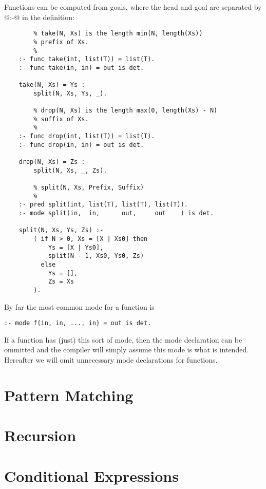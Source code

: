 Functions can be computed from goals, where the head and goal
are separated by @:-@ in the definition:
\begin{verbatim}
        % take(N, Xs) is the length min(N, length(Xs))
        % prefix of Xs.
        %
    :- func take(int, list(T)) = list(T).
    :- func take(in, in) = out is det.

    take(N, Xs) = Ys :-
        split(N, Xs, Ys, _).

        % drop(N, Xs) is the length max(0, length(Xs) - N)
        % suffix of Xs.
        %
    :- func drop(int, list(T)) = list(T).
    :- func drop(in, in) = out is det.

    drop(N, Xs) = Zs :-
        split(N, Xs, _, Zs).

        % split(N, Xs, Prefix, Suffix)
        %
    :- pred split(int, list(T), list(T), list(T)).
    :- mode split(in,  in,      out,     out    ) is det.

    split(N, Xs, Ys, Zs) :-
        ( if N > 0, Xs = [X | Xs0] then
            Ys = [X | Ys0],
            split(N - 1, Xs0, Ys0, Zs)
          else
            Ys = [],
            Zs = Xs
        ).
\end{verbatim}
By far the most common mode for a function is
\begin{verbatim}
:- mode f(in, in, ..., in) = out is det.
\end{verbatim}

If a function has (just) this sort of mode, then the mode
declaration can be ommitted and the compiler will simply assume
this mode is what is intended.  Hereafter we will omit unnecessary
mode declarations for functions.


\section{Pattern Matching}


\section{Recursion}


\section{Conditional Expressions}


